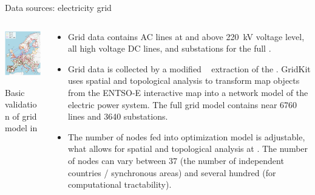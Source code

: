 \begin{frame}{Data sources: electricity grid}
 
  \begin{columns}[T]
  \begin{column}{6cm}

  \centering

  \includegraphics[width=6.5cm]{images/pypsa-eur-grid.png}

  {\footnotesize 
  \vspace{.1cm}
  Basic validation of grid model in 
  }
  \end{column}

  \begin{column}{8cm}
  {\footnotesize
  \begin{itemize}
    \item Grid data contains AC lines at and above 220~kV voltage level, 
    all high voltage DC lines, and substations for the full 
    .
    \item Grid data is collected by a modified \faGithub~ extraction of the . GridKit uses spatial and topological analysis to transform map objects from the ENTSO-E interactive map into a network model of the electric power system. The full grid model contains near 6760 lines and 3640 substations. 
    \item The number of nodes fed into optimization model is adjustable, what allows for spatial and topological analysis at 
    . The number of nodes can vary between 37 (the number of independent countries / synchronous areas) and several hundred (for computational tractability).\\
  \end{itemize}
  }
  
  \end{column}
  \end{columns}

\end{frame}



